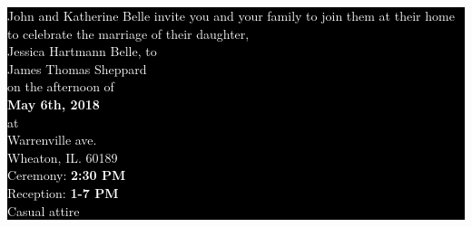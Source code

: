 \documentclass{article}
\begin{document}
\pagecolor{red!60!blue}

\vspace*{0.5in}
\colorbox{black}{\begin{minipage}{0.8\textwidth}
\begin{center}
\vspace{0.5in}
\textcolor{white}{ John and Katherine Belle invite you and your family to join them at their home to celebrate the marriage of their daughter, \\ \vspace{0.1in} {\cursivefont \Large Jessica Hartmann Belle,} to \\ {\cursivefont \LARGE James Thomas Sheppard} \vspace{0.1in} \\ on the afternoon of \\ {\bf May 6th, 2018} \\ \bigskip at \\  Warrenville ave. \\ Wheaton, IL. 60189 \\ \bigskip Ceremony: {\bf 2:30 PM} \\ Reception: {\bf 1-7 PM} \\ \vspace{0.5in} Casual attire \\ \vspace{0.3in}} 
\end{center}
\end{minipage}}
\end{document}
